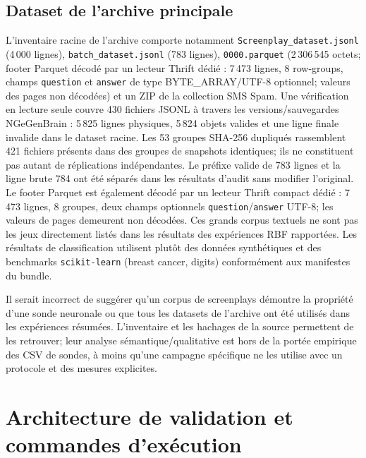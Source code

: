 \documentclass[11pt,a4paper,oneside]{report}
\begin{document}
\section{Dataset de l'archive principale}
L'inventaire racine de l'archive comporte notamment \texttt{Screenplay\_dataset.jsonl} (4\,000 lignes), \texttt{batch\_dataset.jsonl} (783 lignes), \texttt{0000.parquet} (2\,306\,545 octets; footer Parquet décodé par un lecteur Thrift dédié : 7\,473 lignes, 8 row-groups, champs \texttt{question} et \texttt{answer} de type BYTE\_ARRAY/UTF-8 optionnel; valeurs des pages non décodées) et un ZIP de la collection SMS Spam. Une vérification en lecture seule couvre 430 fichiers JSONL à travers les versions/sauvegardes NGeGenBrain : 5\,825 lignes physiques, 5\,824 objets valides et une ligne finale invalide dans le dataset racine. Les 53 groupes SHA-256 dupliqués rassemblent 421 fichiers présents dans des groupes de snapshots identiques; ils ne constituent pas autant de réplications indépendantes. Le préfixe valide de 783 lignes et la ligne brute 784 ont été séparés dans les résultats d’audit sans modifier l’original. Le footer Parquet est également décodé par un lecteur Thrift compact dédié : 7\,473 lignes, 8 groupes, deux champs optionnels \texttt{question}/\texttt{answer} UTF-8; les valeurs de pages demeurent non décodées. Ces grands corpus textuels ne sont pas les jeux directement listés dans les résultats des expériences RBF rapportées. Les résultats de classification utilisent plutôt des données synthétiques et des benchmarks \texttt{scikit-learn} (breast cancer, digits) conformément aux manifestes du bundle.

Il serait incorrect de suggérer qu'un corpus de screenplays démontre la propriété d'une sonde neuronale ou que tous les datasets de l'archive ont été utilisés dans les expériences résumées. L'inventaire et les hachages de la source permettent de les retrouver; leur analyse sémantique/qualitative est hors de la portée empirique des CSV de sondes, à moins qu'une campagne spécifique ne les utilise avec un protocole et des mesures explicites.

\chapter{Architecture de validation et commandes d'exécution}
\end{document}
